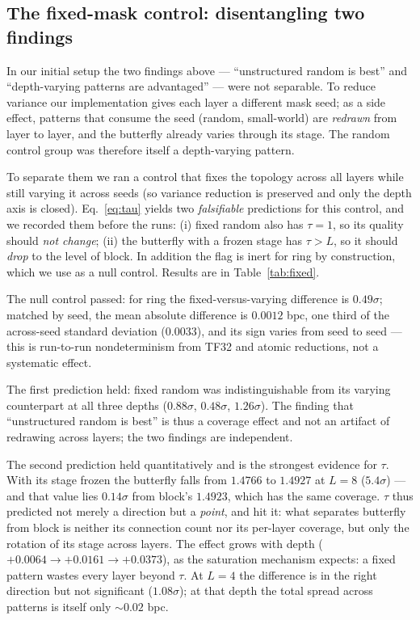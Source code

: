 \documentclass[10pt,journal]{IEEEtran}
\begin{document}
\subsection{The fixed-mask control: disentangling two findings}
\label{sec:fixed}
In our initial setup the two findings above --- ``unstructured random is best'' and
``depth-varying patterns are advantaged'' --- were not separable. To reduce variance our
implementation gives each layer a different mask seed; as a side effect, patterns that consume
the seed (random, small-world) are \emph{redrawn} from layer to layer, and the butterfly already
varies through its stage. The random control group was therefore itself a depth-varying pattern.

To separate them we ran a control that fixes the topology across all layers while still varying
it across seeds (so variance reduction is preserved and only the depth axis is closed).
Eq.~\eqref{eq:tau} yields two \emph{falsifiable} predictions for this control, and we recorded
them before the runs: (i) fixed random also has $\tau{=}1$, so its quality should
\emph{not change}; (ii) the butterfly with a frozen stage has $\tau>L$, so it should
\emph{drop} to the level of block. In addition the flag is inert for ring by construction,
which we use as a null control. Results are in Table~\ref{tab:fixed}.

The null control passed: for ring the fixed-versus-varying difference is $0.49\sigma$; matched
by seed, the mean absolute difference is $0.0012$ bpc, one third of the across-seed standard
deviation ($0.0033$), and its sign varies from seed to seed --- this is run-to-run
nondeterminism from TF32 and atomic reductions, not a systematic effect.

The first prediction held: fixed random was indistinguishable from its varying counterpart at
all three depths ($0.88\sigma$, $0.48\sigma$, $1.26\sigma$). The finding that ``unstructured
random is best'' is thus a coverage effect and not an artifact of redrawing across layers; the
two findings are independent.

The second prediction held quantitatively and is the strongest evidence for $\tau$. With its
stage frozen the butterfly falls from $1.4766$ to $1.4927$ at $L{=}8$ ($5.4\sigma$) --- and that
value lies $0.14\sigma$ from block's $1.4923$, which has the same coverage. $\tau$ thus
predicted not merely a direction but a \emph{point}, and hit it: what separates butterfly from
block is neither its connection count nor its per-layer coverage, but only the rotation of its
stage across layers. The effect grows with depth ($+0.0064 \to +0.0161 \to +0.0373$), as the
saturation mechanism expects: a fixed pattern wastes every layer beyond $\tau$. At $L{=}4$ the
difference is in the right direction but not significant ($1.08\sigma$); at that depth the total
spread across patterns is itself only $\sim\!0.02$ bpc.
\end{document}
